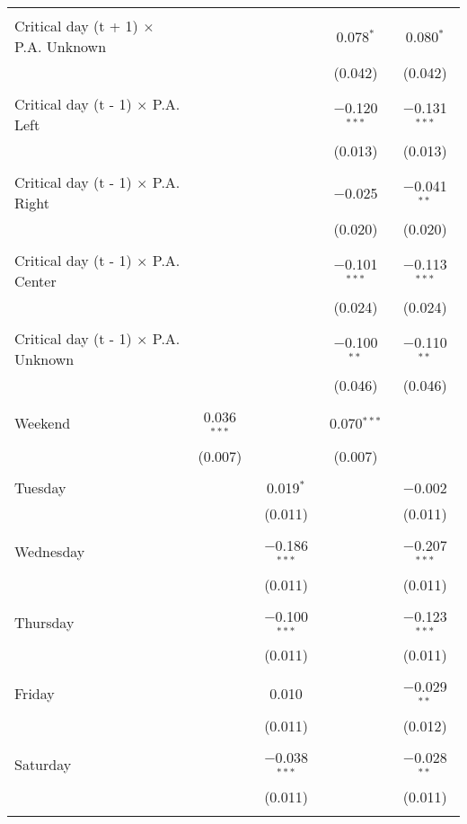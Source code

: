 \documentclass[
]{article}
\begin{document}
\begin{table}[!htbp]
{\begin{tabular}{@{\extracolsep{5pt}}lcccc}
  & & & & \\ 
 Critical day (t + 1) $\times$ P.A. Unknown &  &  & 0.078$^{*}$ & 0.080$^{*}$ \\ 
  &  &  & (0.042) & (0.042) \\ 
  & & & & \\ 
 Critical day (t - 1) $\times$ P.A. Left &  &  & $-$0.120$^{***}$ & $-$0.131$^{***}$ \\ 
  &  &  & (0.013) & (0.013) \\ 
  & & & & \\ 
 Critical day (t - 1) $\times$ P.A. Right &  &  & $-$0.025 & $-$0.041$^{**}$ \\ 
  &  &  & (0.020) & (0.020) \\ 
  & & & & \\ 
 Critical day (t - 1) $\times$ P.A. Center &  &  & $-$0.101$^{***}$ & $-$0.113$^{***}$ \\ 
  &  &  & (0.024) & (0.024) \\ 
  & & & & \\ 
 Critical day (t - 1) $\times$ P.A. Unknown &  &  & $-$0.100$^{**}$ & $-$0.110$^{**}$ \\ 
  &  &  & (0.046) & (0.046) \\ 
  & & & & \\ 
 Weekend & 0.036$^{***}$ &  & 0.070$^{***}$ &  \\ 
  & (0.007) &  & (0.007) &  \\ 
  & & & & \\ 
 Tuesday &  & 0.019$^{*}$ &  & $-$0.002 \\ 
  &  & (0.011) &  & (0.011) \\ 
  & & & & \\ 
 Wednesday &  & $-$0.186$^{***}$ &  & $-$0.207$^{***}$ \\ 
  &  & (0.011) &  & (0.011) \\ 
  & & & & \\ 
 Thursday &  & $-$0.100$^{***}$ &  & $-$0.123$^{***}$ \\ 
  &  & (0.011) &  & (0.011) \\ 
  & & & & \\ 
 Friday &  & 0.010 &  & $-$0.029$^{**}$ \\ 
  &  & (0.011) &  & (0.012) \\ 
  & & & & \\ 
 Saturday &  & $-$0.038$^{***}$ &  & $-$0.028$^{**}$ \\ 
  &  & (0.011) &  & (0.011) \\ 
  & & & & \\ 

\end{tabular}}
\end{table}
\end{document}
